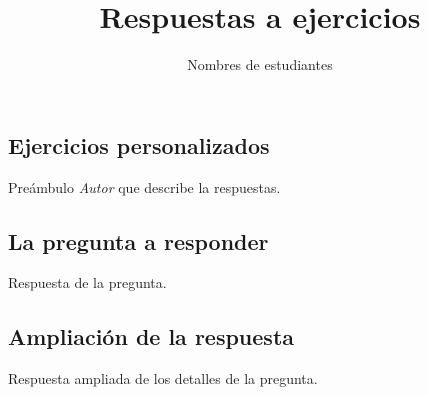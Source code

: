 \documentclass[12pt]{book}
\begin{document}

\begin{book}

\author{Nombres de estudiantes}
\title{Respuestas a ejercicios}

\frontmatter
\maketitle
\tableofcontents

\mainmatter

\chapter[Ejercicios]{Ejercicios personalizados}

Preámbulo \emph{Autor} que describe la respuestas.

\section[Título de la pregunta]{La pregunta a responder}

Respuesta de la pregunta.

\section[Ampliación de la respuesta]{Ampliación de la respuesta}

Respuesta ampliada de los detalles de la pregunta.

\end{book}
\end{document}
